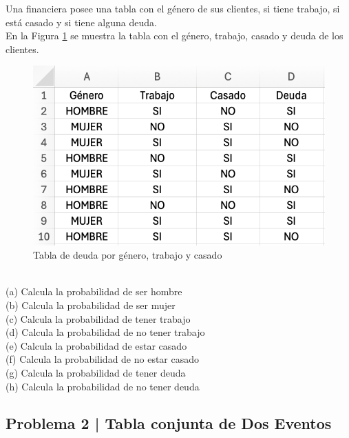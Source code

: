 \documentclass{article}
\begin{document}
Una financiera posee una tabla con el género de sus clientes, si tiene trabajo, si está casado y si tiene alguna deuda.
\\[12pt]
En la Figura \ref{fig:p201} se muestra la tabla con el género, trabajo, casado y deuda de los clientes.
\begin{figure}[!h]
    \centering
    \begin{minipage}{\textwidth}
        \centering
        \includegraphics[width=\textwidth]{figures/p201.png}
    \end{minipage}
    \captionsetup{width=0.9\textwidth}
    \caption{Tabla de deuda por género, trabajo y casado}
    \label{fig:p201}
\end{figure}
\\
(a) Calcula la probabilidad de ser hombre
\\[6pt]
(b) Calcula la probabilidad de ser mujer
\\[6pt]
(c) Calcula la probabilidad de tener trabajo
\\[6pt]
(d) Calcula la probabilidad de no tener trabajo
\\[6pt]
(e) Calcula la probabilidad de estar casado
\\[6pt]
(f) Calcula la probabilidad de no estar casado
\\[6pt]
(g) Calcula la probabilidad de tener deuda
\\[6pt]
(h) Calcula la probabilidad de no tener deuda

\clearpage

\subsection*{Problema 2 | Tabla conjunta de Dos Eventos}
\end{document}
